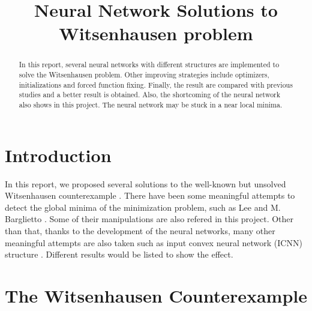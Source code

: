 \documentclass[conference,compsoc]{IEEEtran}
\begin{document}
%
\title{Neural Network Solutions to Witsenhausen problem}
\author{
}
\maketitle

\begin{abstract}
 In this report, several neural networks with different structures are implemented to solve the Witsenhausen problem. Other improving strategies include optimizers, initializations and forced function fixing. Finally, the result are compared with previous studies and a better result is obtained. Also, the shortcoming of the neural network also shows in this project. The neural network may be stuck in a near local minima.
\end{abstract}


\section{Introduction}
  In this report, we proposed several solutions to the well-known but unsolved Witsenhausen counterexample \cite{witsenhausen1968counterexample}. There have been some meaningful attempts to detect the global minima of the minimization problem, such as Lee \cite{lee2001witsenhausen} and M. Barglietto \cite{baglietto2001numerical}. Some of their manipulations are also refered in this project. Other than that, thanks to the development of the neural networks, many other meaningful attempts are also taken such as input convex neural network (ICNN) structure \cite{amos2017input}. Different results would be listed to show the effect.

\section{The Witsenhausen Counterexample}
\end{document}
